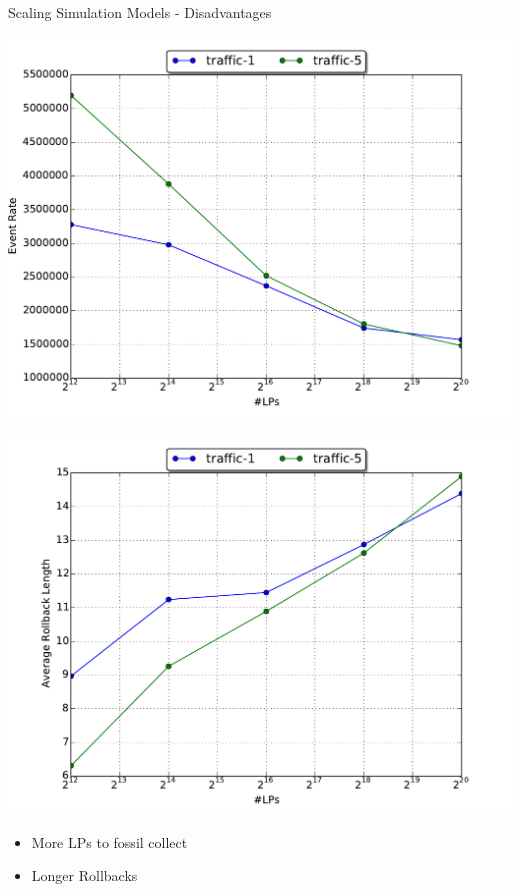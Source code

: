 \documentclass[10pt]{beamer}
\begin{document}
\begin{frame}{Scaling Simulation Models - Disadvantages}
    \begin{minipage}{0.5\textwidth}
        \includegraphics[width=\textwidth]{../figs/scale/scale_event_rate_traffic.pdf}
    \end{minipage}%
    \begin{minipage}{0.5\textwidth}
        \includegraphics[width=\textwidth]{../figs/scale/scale_arl_traffic.pdf}
    \end{minipage}
    \begin{itemize}
        \item More LPs to fossil collect
        \item Longer Rollbacks
    \end{itemize}
\end{frame}
\end{document}
